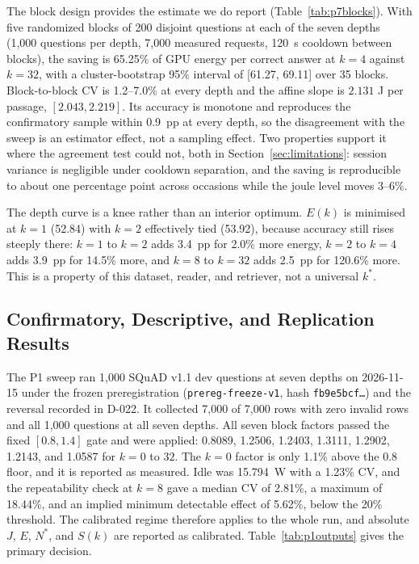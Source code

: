 \documentclass[a4paper,fleqn]{cas-sc}
\begin{document}
The block design provides the estimate we do report (Table~\ref{tab:p7blocks}). With five randomized blocks of 200 disjoint questions at each of the seven depths (1{,}000 questions per depth, 7{,}000 measured requests, 120~s cooldown between blocks), the saving is 65.25\% of GPU energy per correct answer at $k=4$ against $k=32$, with a cluster-bootstrap 95\% interval of [61.27, 69.11] over 35 blocks. Block-to-block CV is 1.2--7.0\% at every depth and the affine slope is $2.131$ J per passage, $[2.043, 2.219]$. Its accuracy is monotone and reproduces the confirmatory sample within 0.9~pp at every depth, so the disagreement with the sweep is an estimator effect, not a sampling effect. Two properties support it where the agreement test could not, both in Section~\ref{sec:limitations}: session variance is negligible under cooldown separation, and the saving is reproducible to about one percentage point across occasions while the joule level moves 3--6\%.

The depth curve is a knee rather than an interior optimum. $E(k)$ is minimised at $k=1$ (52.84) with $k=2$ effectively tied (53.92), because accuracy still rises steeply there: $k=1$ to $k=2$ adds 3.4~pp for 2.0\% more energy, $k=2$ to $k=4$ adds 3.9~pp for 14.5\% more, and $k=8$ to $k=32$ adds 2.5~pp for 120.6\% more. This is a property of this dataset, reader, and retriever, not a universal $k^{*}$.

\subsection{Confirmatory, Descriptive, and Replication Results}\label{sec:p1}

The P1 sweep ran 1{,}000 SQuAD v1.1 dev questions at seven depths on 2026-11-15 under the frozen preregistration (\texttt{prereg-freeze-v1}, hash \texttt{fb9e5bcf\ldots}) and the reversal recorded in D-022. It collected 7{,}000 of 7{,}000 rows with zero invalid rows and all 1{,}000 questions at all seven depths. All seven block factors passed the fixed $[0.8,1.4]$ gate and were applied: 0.8089, 1.2506, 1.2403, 1.3111, 1.2902, 1.2143, and 1.0587 for $k=0$ to $32$. The $k=0$ factor is only 1.1\% above the 0.8 floor, and it is reported as measured. Idle was 15.794~W with a 1.23\% CV, and the repeatability check at $k=8$ gave a median CV of 2.81\%, a maximum of 18.44\%, and an implied minimum detectable effect of 5.62\%, below the 20\% threshold. The calibrated regime therefore applies to the whole run, and absolute $J$, $E$, $N^{*}$, and $S(k)$ are reported as calibrated. Table~\ref{tab:p1outputs} gives the primary decision.
\end{document}
